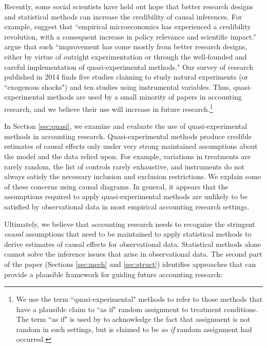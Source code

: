\documentclass[12pt,reqno,titlepage]{amsart}
\begin{document}
\begin{doublespace}
Recently, some social scientists have held out hope that better research designs and statistical methods can increase the credibility of causal inferences.
For example, \citet{Angrist:2010jv} suggest that ``empirical microeconomics has experienced a credibility revolution, with a consequent increase in policy relevance and scientific impact.''  
\citet[p. 26]{Angrist:2010jv} argue that such ``improvement has come mostly from better research designs, either by virtue of outright experimentation or through the well-founded and careful implementation of quasi-experimental methods."
Our survey of research published in 2014 finds five studies claiming to study natural experiments (or ``exogenous shocks") and ten studies using instrumental variables.
Thus, quasi-experimental methods are used by a small minority of papers  in accounting research, and we believe their use will increase in future research.\footnote{
We use the term ``quasi-experimental" methods to refer to those methods that have a plausible claim to ``as if" random assignment to treatment conditions.
The term ``as if" is used by \citet{Dunning:2012tt} to acknowledge the fact that assignment is not random in such settings, but is claimed to be \emph{as if} random assignment had occurred.}

In Section \ref{sec:quasi}, we examine and evaluate the use of quasi-experimental methods in accounting research. 
Quasi-experimental methods produce credible estimates of causal effects only under very strong maintained assumptions about the model and the data relied upon. 
For example, variations in treatments are rarely random, the list of controls rarely exhaustive, and instruments do not always satisfy the necessary inclusion and exclusion restrictions.
We explain some of these concerns using causal diagrams.
In general, it appears that the assumptions required to apply quasi-experimental methods are unlikely to be satisfied by observational data in most empirical accounting research settings.

Ultimately, we believe that accounting research needs to recognize the stringent \emph{causal} assumptions that need to be maintained to apply statistical methods to derive estimates of causal effects for observational data.
Statistical methods alone cannot solve the inference issues that arise in observational data. 
The second part of the paper (Sections \ref{sec:mech} and \ref{sec:struct}) identifies approaches that can provide a plausible framework for guiding future accounting research: 


\end{doublespace}
\end{document}
